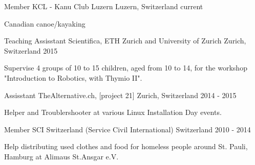 

\begin{cventries}

\cventry
{Member} %
{KCL - Kanu Club Luzern} %
{Luzern, Switzerland} %
{current} %
{
  \begin{cvitems} %
    \item {Canadian canoe/kayaking}
  \end{cvitems}
}

  \cventry
{Teaching Assisstant} %
{Scientifica, ETH Zurich and University of Zurich} %
{Zurich, Switzerland} %
{2015} %
{
  \begin{cvitems} %
    \item {Supervise 4 groups of 10 to 15 children, aged from 10 to 14, for the workshop "Introduction to Robotics, with Thymio II".}
  \end{cvitems}
}

  \cventry
{Assisstant} %
{TheAlternative.ch, [project 21]} %
{Zurich, Switzerland} %
{2014 - 2015} %
{
  \begin{cvitems} %
    \item {Helper and Troublershooter at various Linux Installation Day events.}
  \end{cvitems}
}

  \cventry
{Member} %
{SCI Switzerland (Service Civil International)} %
{Switzerland} %
{2010 - 2014} %
{
  \begin{cvitems} %
    \item {Help distributing used clothes and food for homeless people around St. Pauli, Hamburg at Alimaus St.Ansgar e.V.}
  \end{cvitems}
}

\end{cventries}
